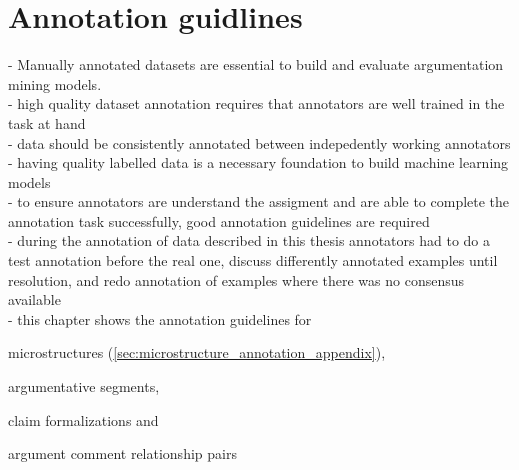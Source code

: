 \chapter{Annotation guidlines}

- Manually annotated datasets are essential to build and evaluate argumentation 
mining models. \\
- high quality dataset annotation requires that annotators are well trained in the task at hand \\
- data should be consistently annotated between indepedently working annotators \\
- having quality labelled data is a necessary foundation to build machine learning 
models \\
- to ensure annotators are understand the assigment and are able to complete 
the annotation task successfully, good annotation guidelines are required \\
- during the annotation of data described in this thesis  
annotators had to do a test annotation before the real one, 
discuss differently annotated examples until resolution, and redo annotation of examples
where there was no consensus available  \\
- this chapter shows the annotation guidelines for \begin{enumerate*}
\item microstructures (\ref{sec:microstructure_annotation_appendix}), 
\item argumentative segments,
\item claim formalizations and
\item argument comment relationship pairs
\end{enumerate*}





